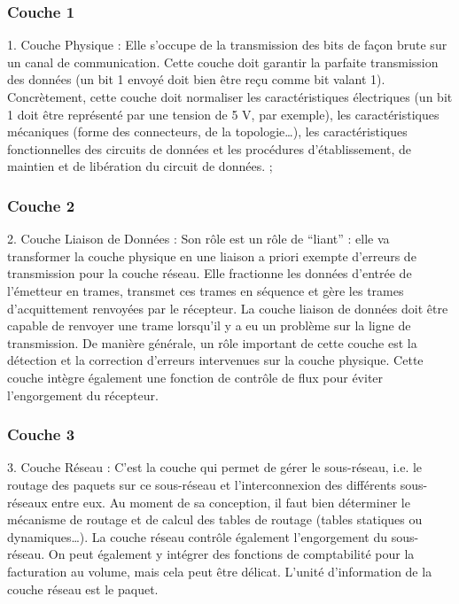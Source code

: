 \subsubsection{Couche 1}
1. Couche Physique : Elle s'occupe de la transmission des bits de façon brute sur un canal de communication. Cette couche doit garantir la parfaite transmission des données (un bit 1 envoyé doit bien être reçu comme bit valant 1). Concrètement, cette couche doit normaliser les caractéristiques électriques (un bit 1 doit être représenté par une tension de 5 V, par exemple), les caractéristiques mécaniques (forme des connecteurs, de la topologie\ldots), les caractéristiques fonctionnelles des circuits de données et les procédures d'établissement, de maintien et de libération du circuit de données. ;
\subsubsection{Couche 2}
2. Couche Liaison de Données : Son rôle est un rôle de ``liant'' : elle va transformer la couche physique en une liaison a priori exempte d'erreurs de transmission pour la couche réseau. Elle fractionne les données d'entrée de l'émetteur en trames, transmet ces trames en séquence et gère les trames d'acquittement renvoyées par le récepteur. La couche liaison de données doit être capable de renvoyer une trame lorsqu'il y a eu un problème sur la ligne de transmission. De manière générale, un rôle important de cette couche est la détection et la correction d'erreurs intervenues sur la couche physique. Cette couche intègre également une fonction de contrôle de flux pour éviter l'engorgement du récepteur.
\subsubsection{Couche 3}
3. Couche Réseau : C'est la couche qui permet de gérer le sous-réseau, i.e. le routage des paquets sur ce sous-réseau et l'interconnexion des différents sous-réseaux entre eux. Au moment de sa conception, il faut bien déterminer le mécanisme de routage et de calcul des tables de routage (tables statiques ou dynamiques\ldots). La couche réseau contrôle également l'engorgement du sous-réseau. On peut également y intégrer des fonctions de comptabilité pour la facturation au volume, mais cela peut être délicat.
L'unité d'information de la couche réseau est le paquet.
